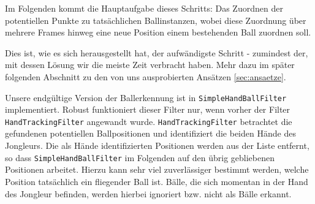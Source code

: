\documentclass[12pt,a4paper,ngerman]{scrartcl}
\begin{document}

Im Folgenden kommt die Hauptaufgabe dieses Schritts: Das Zuordnen der potentiellen
Punkte zu tatsächlichen Ballinstanzen, wobei diese Zuordnung über mehrere Frames
hinweg eine neue Position einem bestehenden Ball zuordnen soll.

Dies ist, wie es sich herausgestellt hat, der aufwändigste Schritt - zumindest der, mit dessen Lösung wir die meiste Zeit verbracht haben. Mehr dazu im später folgenden Abschnitt zu den von uns ausprobierten Ansätzen \ref{sec:ansaetze}.

Unsere endgültige Version der Ballerkennung ist in \lstinline{SimpleHandBallFilter}
implementiert. Robust funktioniert dieser Filter nur, wenn vorher der Filter
\lstinline{HandTrackingFilter} angewandt wurde. \lstinline{HandTrackingFilter}  betrachtet die gefundenen potentiellen Ballpositionen und identifiziert die beiden Hände des Jongleurs. Die als Hände identifizierten Positionen werden aus der Liste entfernt, so dass \lstinline{SimpleHandBallFilter} im Folgenden auf den übrig gebliebenen Positionen arbeitet. Hierzu kann sehr viel zuverlässiger bestimmt werden, welche Position tatsächlich ein fliegender Ball ist. Bälle, die sich momentan in der Hand des Jongleur befinden, werden hierbei ignoriert bzw. nicht als Bälle erkannt.
\end{document}
